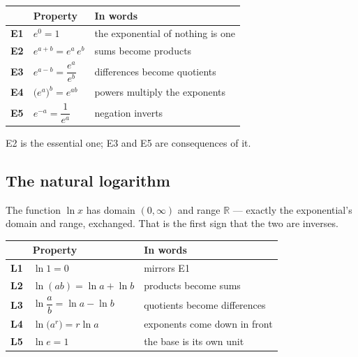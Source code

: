 \documentclass[11pt]{article}
\theoremstyle{plain}
\theoremstyle{definition}
\theoremstyle{remark}
\newcommand{\R}{\mathbb{R}}
\begin{document}
\begin{center}
\renewcommand{\arraystretch}{1.55}
\begin{tabular}{@{}l l l@{}}
\toprule
 & \textbf{Property} & \textbf{In words} \\
\midrule
\textbf{E1} & $e^{0}=1$                       & the exponential of nothing is one \\
\textbf{E2} & $e^{a+b}=e^{a}\,e^{b}$          & sums become products \\
\textbf{E3} & $e^{a-b}=\dfrac{e^{a}}{e^{b}}$  & differences become quotients \\
\textbf{E4} & $\bigl(e^{a}\bigr)^{b}=e^{ab}$  & powers multiply the exponents \\
\textbf{E5} & $e^{-a}=\dfrac{1}{e^{a}}$       & negation inverts \\
\bottomrule
\end{tabular}
\end{center}

\noindent E2 is the essential one; E3 and E5 are consequences of it.

\subsection{The natural logarithm}
The function $\ln x$ has domain $(0,\infty)$ and range $\R$ --- exactly the
exponential's domain and range, exchanged. That is the first sign that the two
are inverses.

\begin{center}
\renewcommand{\arraystretch}{1.55}
\begin{tabular}{@{}l l l@{}}
\toprule
 & \textbf{Property} & \textbf{In words} \\
\midrule
\textbf{L1} & $\ln 1 = 0$                            & mirrors E1 \\
\textbf{L2} & $\ln(ab)=\ln a+\ln b$                  & products become sums \\
\textbf{L3} & $\ln\dfrac{a}{b}=\ln a-\ln b$          & quotients become differences \\
\textbf{L4} & $\ln\bigl(a^{r}\bigr)=r\ln a$          & exponents come down in front \\
\textbf{L5} & $\ln e = 1$                            & the base is its own unit \\
\bottomrule
\end{tabular}
\end{center}
\end{document}
